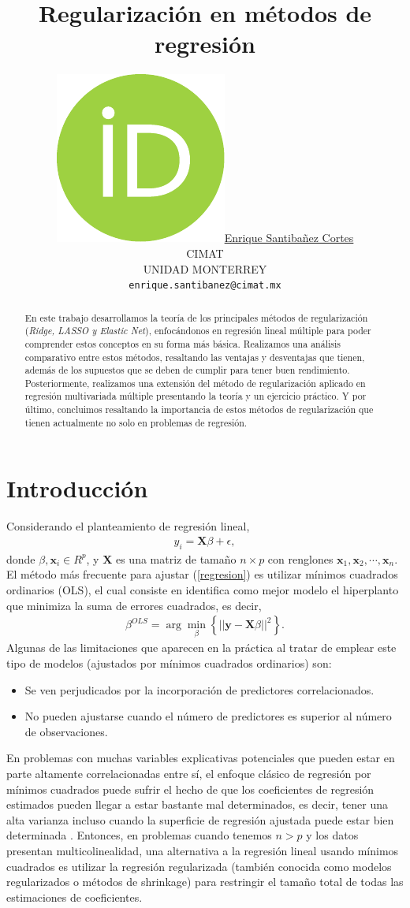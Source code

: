 \documentclass{article}
\title{Regularización en métodos de regresión}
\author{ \href{https://orcid.org/0000-0000-0000-0000}{\includegraphics[scale=0.06]{orcid.pdf}\hspace{1mm}Enrique Santibañez Cortes}\\
	CIMAT\\
	UNIDAD MONTERREY \\
	\texttt{enrique.santibanez@cimat.mx} \\
}
\newcommand{\X}{\mathbf{X}}
\newcommand{\x}{\mathbf{x}}
\newcommand{\y}{\mathbf{y}}
\begin{document}
\maketitle

\begin{abstract}
En este trabajo desarrollamos la teoría de los principales métodos de regularización (\textit{Ridge, LASSO y Elastic Net}), enfocándonos en regresión lineal múltiple para poder comprender estos conceptos en su forma más básica. Realizamos una análisis comparativo entre estos métodos, resaltando las ventajas y desventajas que tienen, además de los supuestos que se deben de cumplir para tener buen rendimiento. Posteriormente, realizamos una extensión del método de regularización aplicado en regresión multivariada múltiple presentando la teoría y un ejercicio práctico. Y por último, concluimos resaltando la importancia de estos métodos de regularización que tienen actualmente no solo en problemas de regresión. 
\end{abstract}


\section{Introducción}
Considerando el planteamiento de regresión lineal, 
    \begin{align}\label{regresion}
        y_i = \X\beta+\epsilon,
    \end{align}
donde $\beta, \x_i\in R^p$, y $\X$ es una matriz de tamaño $n\times p$ con renglones $\x_1, \x_2, \cdots, \x_n.$ El método más frecuente para ajustar (\ref{regresion}) es utilizar mínimos cuadrados ordinarios (OLS), el cual consiste en identifica como mejor modelo el hiperplanto que minimiza la suma de errores cuadrados, es decir,
\begin{align}
    \beta^{OLS} =\arg \min_{\beta} \left\{||\y- \X \beta||^2\right\}.
\end{align}
Algunas de las limitaciones que aparecen en la práctica al tratar de emplear este tipo de modelos (ajustados por mínimos cuadrados ordinarios) son:
\begin{itemize}
    \item Se ven perjudicados por la incorporación de predictores correlacionados.
    \item No pueden ajustarse cuando el número de predictores es superior al número de observaciones.
\end{itemize}
En problemas con muchas variables explicativas potenciales que pueden estar en parte altamente correlacionadas entre sí, el enfoque clásico de regresión por mínimos cuadrados puede sufrir el hecho de que los coeficientes de regresión estimados pueden llegar a estar bastante mal determinados, es decir, tener una alta varianza incluso cuando la superficie de regresión ajustada puede estar bien determinada \citep{Boehmke2019HandsOnML}. Entonces, en problemas cuando tenemos $n>p$ y los datos presentan multicolinealidad, una alternativa a la regresión lineal usando mínimos cuadrados es utilizar la regresión regularizada (también conocida como modelos regularizados o métodos de shrinkage) para restringir el tamaño total de todas las estimaciones de coeficientes.
\end{document}
